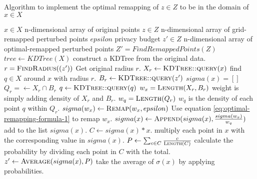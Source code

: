 \begin{algorithm}[H]
  \caption{Algorithm to implement the optimal remapping of $z \in Z$ to be in the domain of $x \in X$}
  \begin{algorithmic}
    \Require $x \in X$  \Comment n-dimensional array of original points
    \Require $z \in Z$ \Comment n-dimensional array of grid-remapped perturbed points
    \Require $epsilon$ \Comment privacy budget
    \Ensure $z' \in Z$ \Comment n-dimensional array of optimal-remapped perturbed points
    \State $Z' = FindRemappedPoints(Z)$
    \State $tree \gets KDTree(X)$ \Comment construct a KDTree from the original data.
    \State $r = \Call{FindRadius}{(z')}$ \Comment Get original radius $r$.
    \State $X_r \gets \Call{KDTree::query}{x}$ \Comment find $q \in X$ around $x$ with radius $r$.
    \State $B_r \gets \Call{KDTree::query}{z'} $
    \State $sigma(x) = []$
    \State $Q_r = \gets X_r \cap B_r$
    \State $q \gets \Call{KDTree::query}{q}$
    \State $w_x = \Call{Length}{X_r, B_r}$ \Comment weight is simply adding density of $X_r$ and $B_r$.
    \State $w_q = \Call{Length}{Q_r}$ \Comment $w_q$ is the density of each point $q$ within $Q_r$.
    \State $sigma(w_x) \gets \Call{Remap}{w_x, epsilon}$ \Comment Use equation \ref{eq:optimal-remapping-formula-1} to remap $w_x$.
    \State $sigma(x) \gets \Call{Append}{sigma(x), \frac{sigma(w_x)}{w_q}}$ \Comment add to the list $sigma(x)$.
    \EndFor
    \State $C \gets sigma(x) * x$. \Comment multiply each point in $x$ with the corresponding value in $sigma(x)$.
    \State $P \gets \sum_{c \in C} \frac{c}{\Call{Length}{C}}$ \Comment calculate the probability by dividing each point in $C$ with the total.
    \State $z' \gets \Call{Average}{sigma(x), P}$ \Comment take the average of $\sigma(x)$ by applying probabilities.
    \EndFor
  \end{algorithmic}
  \label{alg:optimal-remapping-laplace}
\end{algorithm}